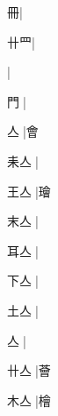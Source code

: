 \begin{multicols}{2}
{{\cjk{}{\cnsym{}　}{\cnsym{}　}冊}\mktsJzrVerticalBar{}{\cjk{}{\cnsym{}　}{\cnsym{}　}{\cnsym{}　}}|{}\par
{\cjk{}{\cnsym{}　}卄{\cnxHanaA{}罒}}\mktsJzrVerticalBar{}{\cjk{}{\cnsym{}　}{\cnsym{}　}{\cnsym{}　}}|{}\par
{}\mktsJzrVerticalBar{}{\cjk{}{\cnsym{}　}{\cnsym{}　}{\cnsym{}　}}|{}\par
{\cjk{}{\cnsym{}　}門{\cnjzr{}}}\mktsJzrVerticalBar{}{\cjk{}{\cnsym{}　}{\cnsym{}　}{\cnsym{}　}}|{}\par
{\cjk{}{\cnsym{}　}亼{\cnjzr{}}}\mktsJzrVerticalBar{}{\cjk{}{\cnsym{}　}{\cnsym{}　}{\cnsym{}　}}|{\cjk{}會}\par
{\cjk{}耒亼{\cnjzr{}}}\mktsJzrVerticalBar{}{\cjk{}{\cnsym{}　}{\cnsym{}　}{\cnsym{}　}}|{}\par
{\cjk{}王亼{\cnjzr{}}}\mktsJzrVerticalBar{}{\cjk{}{\cnsym{}　}{\cnsym{}　}{\cnsym{}　}}|{\cjk{}璯}\par
{\cjk{}末亼{\cnjzr{}}}\mktsJzrVerticalBar{}{\cjk{}{\cnsym{}　}{\cnsym{}　}{\cnsym{}　}}|{}\par
{\cjk{}耳亼{\cnjzr{}}}\mktsJzrVerticalBar{}{\cjk{}{\cnsym{}　}{\cnsym{}　}{\cnsym{}　}}|{}\par
{\cjk{}下亼{\cnjzr{}}}\mktsJzrVerticalBar{}{\cjk{}{\cnsym{}　}{\cnsym{}　}{\cnsym{}　}}|{}\par
{\cjk{}土亼{\cnjzr{}}}\mktsJzrVerticalBar{}{\cjk{}{\cnsym{}　}{\cnsym{}　}{\cnsym{}　}}|{}\par
{亼{\cnjzr{}}}\mktsJzrVerticalBar{}{\cjk{}{\cnsym{}　}{\cnsym{}　}{\cnsym{}　}}|{}\par
{\cjk{}卄亼{\cnjzr{}}}\mktsJzrVerticalBar{}{\cjk{}{\cnsym{}　}{\cnsym{}　}{\cnsym{}　}}|{\cjk{}薈}\par
{\cjk{}木亼{\cnjzr{}}}\mktsJzrVerticalBar{}{\cjk{}{\cnsym{}　}{\cnsym{}　}{\cnsym{}　}}|{\cjk{}檜}\par
}
\end{multicols}
